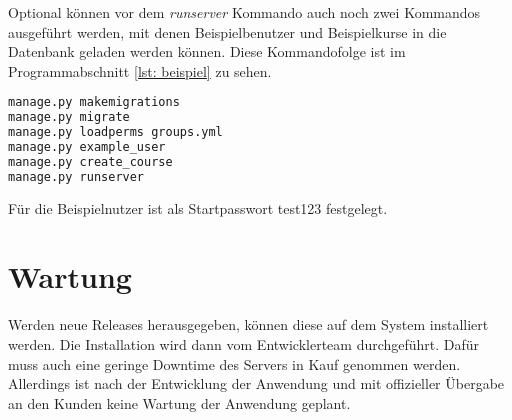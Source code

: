 Optional können vor dem \textit{runserver} Kommando auch noch zwei Kommandos ausgeführt werden, mit denen Beispielbenutzer und Beispielkurse in die Datenbank geladen werden können. Diese Kommandofolge ist im Programmabschnitt \ref{lst: beispiel} zu sehen.

\begin{lstlisting}[language = bash, caption = Kommandozeilenanweisungen zum Starten des Servers, label = lst: beispiel]
manage.py makemigrations
manage.py migrate
manage.py loadperms groups.yml
manage.py example_user
manage.py create_course
manage.py runserver
\end{lstlisting}

Für die Beispielnutzer ist als Startpasswort \glqq test123\grqq\; festgelegt.

\section{Wartung}
Werden neue Releases herausgegeben, können diese auf dem System installiert werden. Die Installation wird dann vom Entwicklerteam durchgeführt. Dafür muss auch eine geringe Downtime des Servers in Kauf genommen werden. 
Allerdings ist nach der Entwicklung der Anwendung und mit offizieller Übergabe an den Kunden keine Wartung der Anwendung geplant.